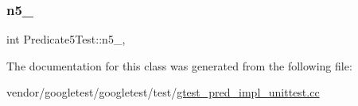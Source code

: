 \mbox{\label{class_predicate5_test_a96badba6366235a2771b27ea014bd9ce}} 
\subsubsection{\texorpdfstring{n5\+\_\+}{n5\_}}
{\footnotesize\ttfamily int Predicate5\+Test\+::n5\+\_\+\hspace{0.3cm}{\ttfamily [static]}, {\ttfamily [protected]}}



The documentation for this class was generated from the following file\+:\begin{DoxyCompactItemize}
\item 
vendor/googletest/googletest/test/\hyperlink{gtest__pred__impl__unittest_8cc}{gtest\+\_\+pred\+\_\+impl\+\_\+unittest.\+cc}\end{DoxyCompactItemize}
